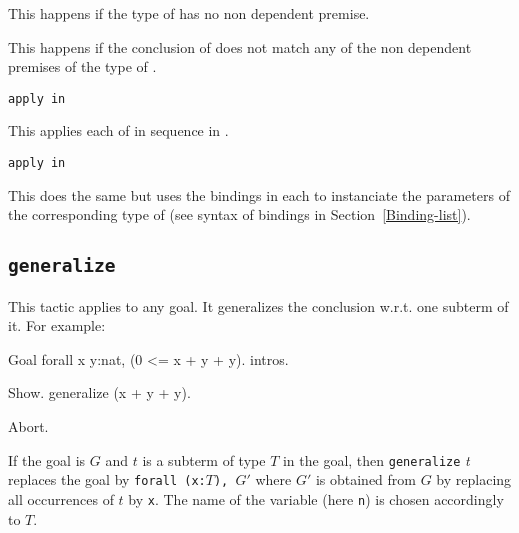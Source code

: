 \begin{ErrMsgs}
\item {}

This happens if the type of {\term} has no non dependent premise.

\item {}

This happens if the conclusion of {\ident} does not match any of the
non dependent premises of the type of {\term}.
\end{ErrMsgs}

\begin{Variants}
\item {\tt apply \nelist{\term}{,} in {\ident}}

This applies each of {\term} in sequence in {\ident}.

\item {\tt apply \nelist{{\term} {\bindinglist}}{,} in {\ident}}

This does the same but uses the bindings in each {\bindinglist} to 
instanciate the parameters of the corresponding type of {\term}
(see syntax of bindings in Section~\ref{Binding-list}).

\end{Variants}

\subsection{\tt generalize \term
{}
\label{generalize}}

This tactic applies to any goal. It generalizes the conclusion w.r.t.
one subterm of it. For example:

\begin{coq_eval}
Goal forall x y:nat, (0 <= x + y + y).
intros.
\end{coq_eval}
\begin{coq_example}
Show.
generalize (x + y + y).
\end{coq_example}

\begin{coq_eval}
Abort.
\end{coq_eval}

If the goal is $G$ and $t$ is a subterm of type $T$ in the goal, then
{\tt generalize} \textit{t} replaces the goal by {\tt forall (x:$T$), $G'$}
where $G'$ is obtained from $G$ by replacing all occurrences of $t$ by
{\tt x}. The name of the variable (here {\tt n}) is chosen accordingly
to $T$.

